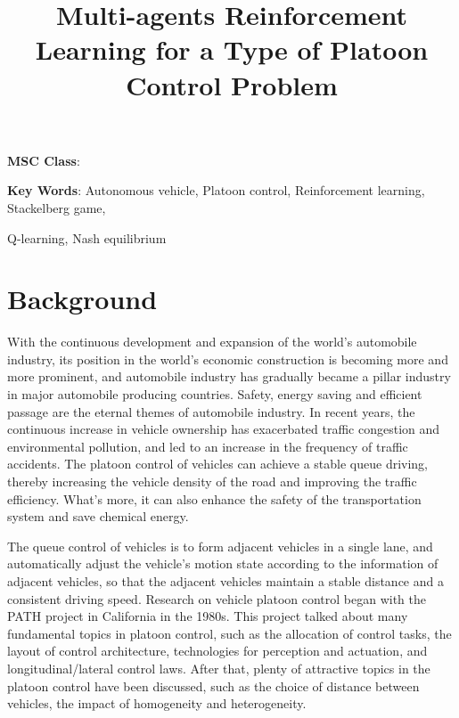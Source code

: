 \documentclass{article}
\title{Multi-agents Reinforcement Learning for a Type of Platoon Control Problem}
\begin{document}
\maketitle


\begin{abstract}


\end{abstract}



\hspace{.2in} {\bf MSC Class}: 

\hspace{.2in} {\bf Key Words}: Autonomous vehicle, Platoon control, Reinforcement learning, Stackelberg game,

\hspace{1.1in}  
Q-learning, Nash equilibrium



\newpage

\section{Background}
With the continuous development and expansion of the world's automobile industry, its position in the world's economic construction is becoming more and more prominent, and automobile industry has gradually became a pillar industry in major automobile producing countries.  Safety, energy saving and efficient passage are the eternal themes of automobile industry. In recent years, the continuous increase in vehicle ownership has exacerbated traffic congestion and environmental pollution, and led to an increase in the frequency of traffic accidents. The platoon control of vehicles can achieve a stable queue driving, thereby increasing the vehicle density of the road and improving the traffic efficiency. What's more, it can also enhance the safety of the transportation system and save chemical energy.

The queue control of vehicles is to form adjacent vehicles in a single lane, and automatically adjust the vehicle's motion state according to the information of adjacent vehicles, so that the adjacent vehicles maintain a stable distance and a consistent driving speed. Research on vehicle platoon control began with the PATH project in California in the 1980s. This project talked about many fundamental topics in platoon control, such as the allocation of control tasks, the layout of control architecture, technologies for perception and actuation, and longitudinal/lateral control laws. After that, plenty of attractive topics in the platoon control have been discussed, such as the choice of distance between vehicles, the impact of homogeneity and heterogeneity. 
\end{document}

